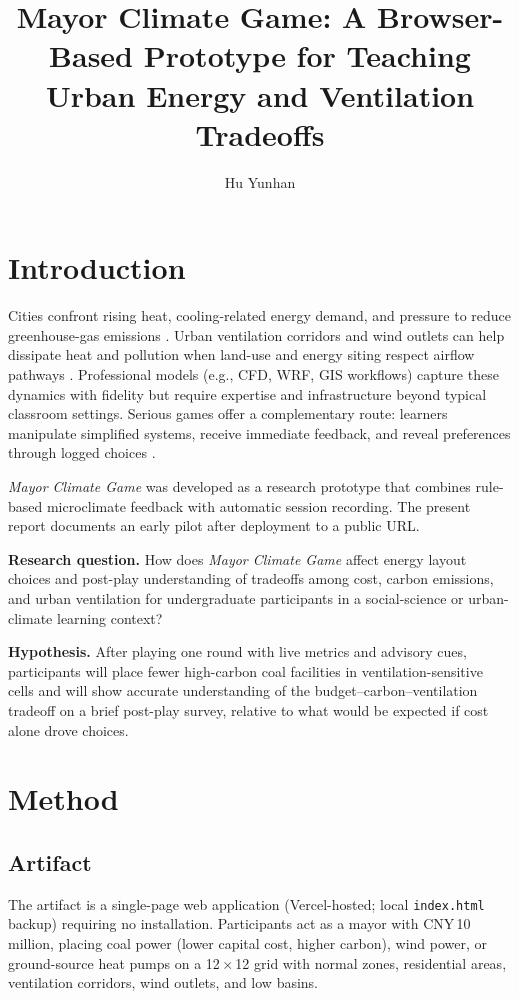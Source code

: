 \documentclass[stu, 12pt, apacite]{apa7}
\title{Mayor Climate Game: A Browser-Based Prototype for Teaching Urban Energy and Ventilation Tradeoffs}
\author{Hu Yunhan}
\affiliation{Generation AI 2026 Research Project}
\begin{document}
\maketitle

\section{Introduction}

Cities confront rising heat, cooling-related energy demand, and pressure to reduce greenhouse-gas emissions \cite{iea2023stayingcool,iea2023sustainablecooling}. Urban ventilation corridors and wind outlets can help dissipate heat and pollution when land-use and energy siting respect airflow pathways \cite{zheng2022urban,guan2015guiyang}. Professional models (e.g., CFD, WRF, GIS workflows) capture these dynamics with fidelity but require expertise and infrastructure beyond typical classroom settings. Serious games offer a complementary route: learners manipulate simplified systems, receive immediate feedback, and reveal preferences through logged choices \cite{seriousgame2019neighbourhood}.

\textit{Mayor Climate Game} was developed as a research prototype that combines rule-based microclimate feedback with automatic session recording. The present report documents an early pilot after deployment to a public URL.

\textbf{Research question.} How does \textit{Mayor Climate Game} affect energy layout choices and post-play understanding of tradeoffs among cost, carbon emissions, and urban ventilation for undergraduate participants in a social-science or urban-climate learning context?

\textbf{Hypothesis.} After playing one round with live metrics and advisory cues, participants will place fewer high-carbon coal facilities in ventilation-sensitive cells and will show accurate understanding of the budget--carbon--ventilation tradeoff on a brief post-play survey, relative to what would be expected if cost alone drove choices.

\section{Method}

\subsection{Artifact}

The artifact is a single-page web application (Vercel-hosted; local \texttt{index.html} backup) requiring no installation. Participants act as a mayor with CNY\,10 million, placing coal power (lower capital cost, higher carbon), wind power, or ground-source heat pumps on a 12\,$\times$\,12 grid with normal zones, residential areas, ventilation corridors, wind outlets, and low basins.
\end{document}
